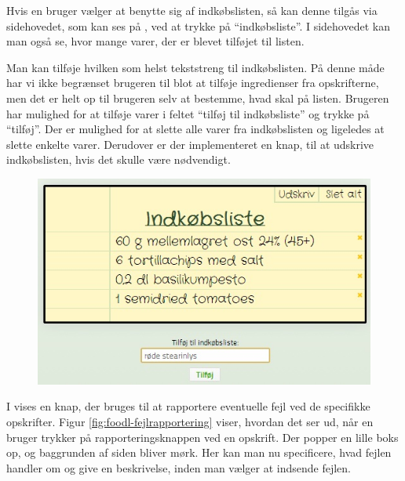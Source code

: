 Hvis en bruger vælger at benytte sig af indkøbslisten, så kan denne tilgås via sidehovedet, som kan ses på , ved at trykke på ``indkøbsliste''. I sidehovedet kan man også se, hvor mange varer, der er blevet tilføjet til listen. 

Man kan tilføje hvilken som helst tekststreng til indkøbslisten. På denne måde har vi ikke begrænset brugeren til blot at tilføje ingredienser fra opskrifterne, men det er helt op til brugeren selv at bestemme, hvad skal på listen. Brugeren har mulighed for at tilføje varer i feltet ``tilføj til indkøbsliste'' og trykke på ``tilføj''. Der er mulighed for at slette alle varer fra indkøbslisten og ligeledes at slette enkelte varer. Derudover er der implementeret en knap, til at udskrive indkøbslisten, hvis det skulle være nødvendigt.

\begin{figure}[H]
	\centering
	\includegraphics[scale=0.7]{billeder/foodl/indkoebsliste.jpg}
	\label{fig:foodl-indkoebsliste}
\end{figure}

I  vises en knap, der bruges til at rapportere eventuelle fejl ved de specifikke opskrifter. Figur \ref{fig:foodl-fejlrapportering} viser, hvordan det ser ud, når en bruger trykker på rapporteringsknappen ved en opskrift. Der popper en lille boks op, og baggrunden af siden bliver mørk. Her kan man nu specificere, hvad fejlen handler om og give en beskrivelse, inden man vælger at indsende fejlen.

